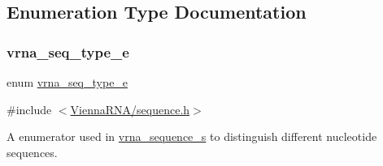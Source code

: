 \subsection{Enumeration Type Documentation}
\mbox{\label{group__alphabet__utils_ga85cda3fcf5d6bd7ec090d3a96e808609}} 
\subsubsection{\texorpdfstring{vrna\+\_\+seq\+\_\+type\+\_\+e}{vrna\_seq\_type\_e}}
{\footnotesize\ttfamily enum \hyperlink{group__alphabet__utils_ga85cda3fcf5d6bd7ec090d3a96e808609}{vrna\+\_\+seq\+\_\+type\+\_\+e}}



{\ttfamily \#include $<$\hyperlink{sequence_8h}{Vienna\+R\+N\+A/sequence.\+h}$>$}



A enumerator used in \hyperlink{group__alphabet__utils_structvrna__sequence__s}{vrna\+\_\+sequence\+\_\+s} to distinguish different nucleotide sequences. 

